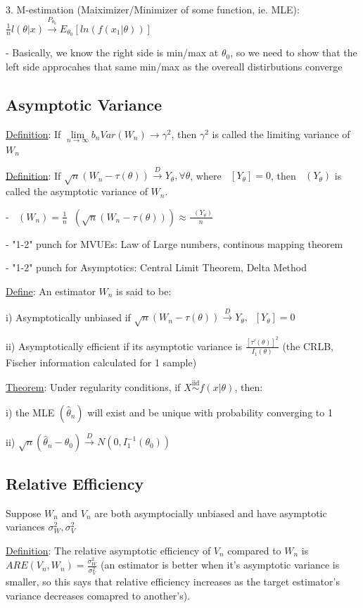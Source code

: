 \documentclass{article}
\DeclareMathOperator{\EX}{\mathbb{E}} %
\DeclareMathOperator{\ext}{\EX_{\theta}} %
\DeclareMathOperator{\vart}{Var_{\theta}} %
\newcommand{\dto}{\overset{D}{\to}}
\let\Oldlim=\lim
\renewcommand{\lim}{\Oldlim\limits}
\newcommand{\iiddist}{\overset{\mathrm{iid}}{\sim}}
\begin{document}
3. M-estimation (Maiximizer/Minimizer of some function, ie. MLE): $\frac{1}{n}l(\theta|x) \overset{P_{\theta_0}}{\to} E_{\theta_0}[ln(f(x_1|\theta))]$

- Basically, we know the right side is min/max at $\theta_0$, so we need to show that the left side approcahes that same min/max as the overeall distirbutions converge

\subsection{Asymptotic Variance}

\underline{Definition}: If $\lim_{n\to\infty} b_n Var(W_n) \to \gamma^2$, then $\gamma^2$ is called the limiting variance of $W_n$

\underline{Definition}: If $\sqrt{n}(W_n - \tau(\theta)) \dto Y_{\theta}, \forall \theta$, where $\ext[Y_{\theta}] = 0$, then $\vart(Y_{\theta})$ is called the asymptotic variance of $W_n$.

- $\vart(W_n) = \frac{1}{n}\vart(\sqrt{n}(W_n - \tau(\theta))) \approx \frac{\vart(Y_{\theta})}{n}$

- "1-2" punch for MVUEs: Law of Large numbers, continous mapping theorem

- "1-2" punch for Asymptotics: Central Limit Theorem, Delta Method

\underline{Define}: An estimator $W_n$ is said to be:

i) Asymptotically unbiased if $\sqrt{n}(W_n - \tau(\theta)) \dto Y_{\theta}, \ext[Y_{\theta}] = 0$

ii) Asymptotically efficient if its asymptotic variance is $\frac{[\tau'(\theta)]^2}{I_1(\theta)}$ (the CRLB, Fischer information calculated for 1 sample)

\underline{Theorem}: Under regularity conditions, if $X \iiddist f(x|\theta)$, then:

i) the MLE $(\hat{\theta}_n)$ will exist and be unique with probability converging to 1

ii) $\sqrt{n}(\hat{\theta}_n - \theta_0) \dto N(0, I_1^{-1}(\theta_0))$

\subsection{Relative Efficiency}

Suppose $W_n$ and $V_n$ are both asymptocially unbiased and have asymptotic variances $\sigma^2_W, \sigma^2_V$

\underline{Definition}: The relative asymptotic efficiency  of $V_n$ compared to $W_n$ is $ARE(V_n, W_n) = \frac{\sigma^2_W}{\sigma^2_V}$ (an estimator is better when it's asymptotic variance is smaller, so this says that relative efficiency increases as the target estimator's variance decreases comapred to another's).
\end{document}
